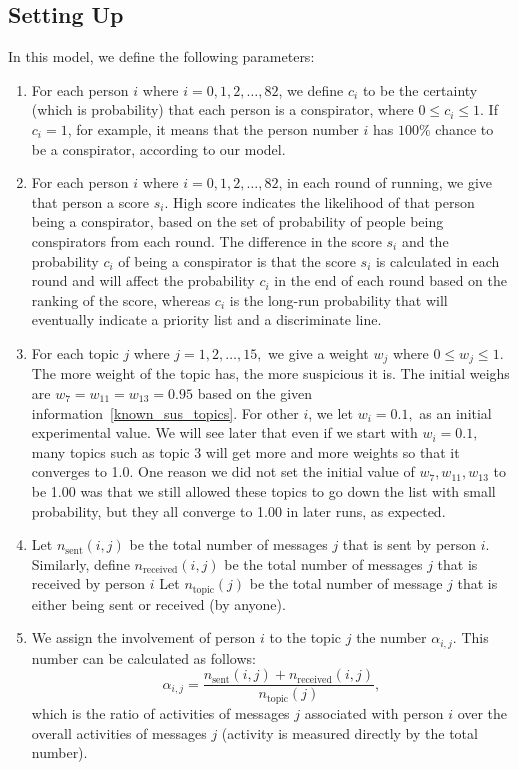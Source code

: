\documentclass{icmmcm}
\begin{document}
\subsection{Setting Up}
In this model, we define the following parameters:
\begin{enumerate}
\item  For each person $i$ where $i=0,1,2,\ldots, 82$, 
we define $c_i$ to be the certainty (which is probability)
that each person is a conspirator,
where $0\leq c_i \leq 1.$ 
If $c_i=1$, for example, it means that the person
number $i$ has $100\%$ chance to be
a conspirator, according to our model. 

\item  For each person $i$ where $i=0,1,2,\ldots, 82$, in each round of running,
we give that person a score $s_i$. High score indicates
the likelihood of that person being a conspirator, 
based on the set
of probability of people being conspirators from each round.
The difference in the score $s_i$ and the probability $c_i$ of
being a conspirator is that the score $s_i$ is calculated in each round
and will affect the probability $c_i$ in the end of each round
based on the ranking of the score, whereas $c_i$ is the long-run
probability that will eventually indicate a priority list and
a discriminate line.

\item For each topic $j$ where $j=1,2,\ldots,15,$
we give a weight $w_j$ where $0\leq w_j\leq 1.$
The more weight of the topic has, the more suspicious it is.
The initial weighs are $w_7 = w_{11} = w_{13} = 0.95$ based
on the  given information~\eqref{known_sus_topics}.
For other $i$, we let $w_i = 0.1,$ as an initial 
experimental value. We will see later that even if
we start with $w_i = 0.1,$ many topics such as 
topic 3 will get more and more weights so that
it converges to 1.0. One reason we did not set the initial
value of $w_7, w_{11}, w_{13}$ to be 1.00 was that
we still allowed these topics to go down the list with
small probability, but they all converge to 1.00 
in later runs, as expected.

\item Let $n_{\text{sent}}(i,j)$ be the total 
number of messages $j$ that is sent by person $i$.
Similarly, define $n_{\text{received}}(i,j)$ be the total 
number of messages $j$ that is received by person $i$
Let $n_{\text{topic}}(j)$ be the total number of message $j$
that is either being sent or received (by anyone).

\item  We assign the involvement of person $i$ to the topic $j$ the number
$\alpha_{i,j}.$ This number can be calculated as follows:
\[\alpha_{i,j} = \frac{n_{\text{sent}}(i,j) + n_{\text{received}}(i,j)}
{n_{\text{topic}}(j)},\]
which is the ratio of activities of messages $j$ associated
with person $i$ over the overall activities of messages $j$
(activity is measured directly by the total number).
\end{enumerate}
\end{document}
